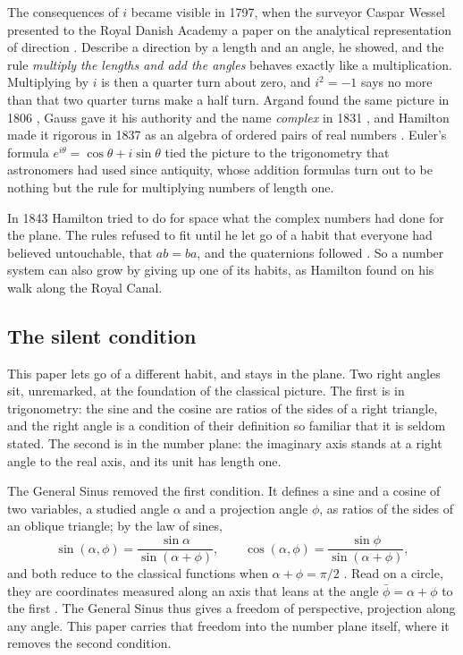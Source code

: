\documentclass[11pt,a4paper]{amsart}
\theoremstyle{plain}
\theoremstyle{definition}
\theoremstyle{remark}
\newcommand{\pb}{\bar{\phi}}                     %
\begin{document}
The consequences of $i$ became visible in 1797, when the surveyor Caspar Wessel presented to the Royal Danish Academy a paper on the analytical representation of direction \citep{Wessel1799}. Describe a direction by a length and an angle, he showed, and the rule \emph{multiply the lengths and add the angles} behaves exactly like a multiplication. Multiplying by $i$ is then a quarter turn about zero, and $i^2 = -1$ says no more than that two quarter turns make a half turn. Argand found the same picture in 1806 \citep{Argand1806}, Gauss gave it his authority and the name \emph{complex} in 1831 \citep{Gauss1831}, and Hamilton made it rigorous in 1837 as an algebra of ordered pairs of real numbers \citep{Hamilton1837}. Euler's formula $e^{i\theta} = \cos\theta + i\sin\theta$ \citep{Euler1748} tied the picture to the trigonometry that astronomers had used since antiquity, whose addition formulas turn out to be nothing but the rule for multiplying numbers of length one.

In 1843 Hamilton tried to do for space what the complex numbers had done for the plane. The rules refused to fit until he let go of a habit that everyone had believed untouchable, that $ab = ba$, and the quaternions followed \citep{Hamilton1844,Kline1972}. So a number system can also grow by giving up one of its habits, as Hamilton found on his walk along the Royal Canal.

\subsection{The silent condition}

This paper lets go of a different habit, and stays in the plane. Two right angles sit, unremarked, at the foundation of the classical picture. The first is in trigonometry: the sine and the cosine are ratios of the sides of a right triangle, and the right angle is a condition of their definition so familiar that it is seldom stated. The second is in the number plane: the imaginary axis stands at a right angle to the real axis, and its unit has length one.

The General Sinus \citep{Derraz2017,Derraz2026GSP} removed the first condition. It defines a sine and a cosine of two variables, a studied angle $\alpha$ and a projection angle $\phi$, as ratios of the sides of an oblique triangle; by the law of sines,
\[
\sin(\alpha, \phi) = \frac{\sin\alpha}{\sin(\alpha + \phi)} , \qquad \cos(\alpha, \phi) = \frac{\sin\phi}{\sin(\alpha + \phi)} ,
\]
and both reduce to the classical functions when $\alpha + \phi = \pi/2$ \citep[Theorem~3.7 and Corollary~3.8]{Derraz2026GSP}. Read on a circle, they are coordinates measured along an axis that leans at the angle $\pb = \alpha + \phi$ to the first \citep[Proposition~4.12]{Derraz2026GSP}. The General Sinus thus gives a freedom of perspective, projection along any angle. This paper carries that freedom into the number plane itself, where it removes the second condition.
\end{document}

